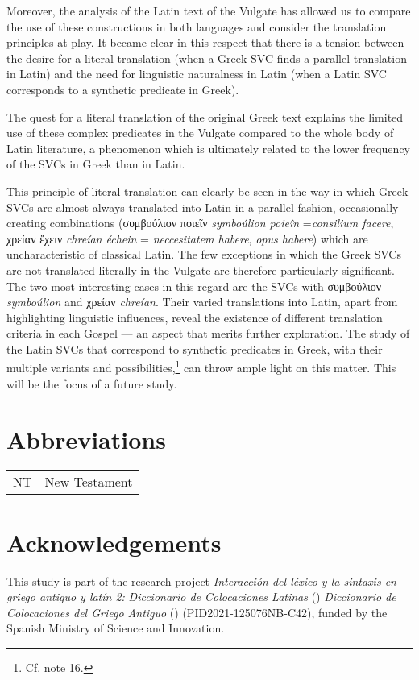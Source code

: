 \documentclass[output=paper,colorlinks,citecolor=brown]{langscibook}
\begin{document}
Moreover, the analysis of the Latin text of the Vulgate has allowed us to compare the use
of these constructions in both languages and consider the translation principles at play.
It became clear in this respect that there is a tension between the desire for a literal
translation (when a Greek SVC finds a parallel translation in Latin) and the need for
linguistic naturalness in Latin (when a Latin SVC corresponds to a synthetic predicate in
Greek).

The quest for a literal translation of the original Greek text explains the limited use of
these complex predicates in the Vulgate compared to the whole body of Latin literature, a
phenomenon which is ultimately related to the lower frequency of the SVCs in Greek than in
Latin.

This principle of literal translation can clearly be seen in the way in which Greek SVCs
are almost always translated into Latin in a parallel fashion, occasionally creating
combinations (συμβούλιον ποιεῖν \emph{symboúlion poieîn} =\linebreak \emph{consilium
  facere}, χρείαν ἔχειν \emph{chreían échein} = \emph{neccesitatem habere}, \emph{opus
  habere}) which are uncharacteristic of classical Latin. The few exceptions in which the
Greek SVCs are not translated literally in the Vulgate are therefore particularly
significant. The two most interesting cases in this regard are the SVCs with συμβούλιον
\emph{symboúlion} and χρείαν \emph{chreían}. Their varied translations into Latin,
apart from highlighting linguistic influences, reveal the existence of different
translation criteria in each Gospel --- an aspect that merits further exploration. The study
of the Latin SVCs that correspond to synthetic predicates in Greek, with their multiple
variants and possibilities,\footnote{Cf. note 16.} can throw ample light on this matter.
This will be the focus of a future study.

\section*{Abbreviations}
\begin{tabularx}{.5\textwidth}{@{}lQ@{}}
NT & New Testament \\
\end{tabularx}


\section*{Acknowledgements}
This study is part of the research project
  \emph{Interacción del léxico y la sintaxis en griego antiguo y latín 2:}
  \emph{Diccionario de Colocaciones Latinas} (\cite{banos_dicolat_nodate})
  \emph{Diccionario de Colocaciones del Griego Antiguo}
  (\cite{jimenez_lopez_dicogra_nodate}) (PID2021-125076NB-C42), funded by the Spanish
  Ministry of Science and Innovation.


\sloppy
 \printbibliography[heading=subbibliography,notkeyword=this]
\end{document}
